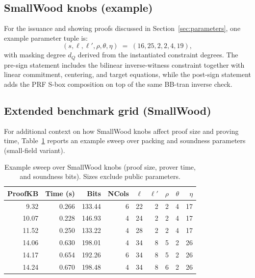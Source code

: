 \subsection{SmallWood knobs (example)}
For the issuance and showing proofs discussed in Section~\ref{sec:parameters}, one example parameter tuple is:
\[
  (s,\ell,\ell',\rho,\theta,\eta)\;=\;(16,25,2,2,4,19),
\]
with masking degree \(d_Q\) derived from the instantiated constraint degrees. The pre-sign statement includes the bilinear inverse-witness constraint together with linear commitment, centering, and target equations, while the post-sign statement adds the PRF S-box composition on top of the same BB-tran inverse check.

\subsection{Extended benchmark grid (SmallWood)}
For additional context on how SmallWood knobs affect proof size and proving time, Table~\ref{tab:results-grid} reports
an example sweep over packing and soundness parameters (small-field variant).

\begin{table}[H]
\centering
\footnotesize
\setlength{\tabcolsep}{4pt}
\begin{tabular}{r r r r r r r r r}
\toprule
\textbf{ProofKB} & \textbf{Time (s)} & \textbf{Bits} & \textbf{NCols} & \(\ell\) & \(\ell'\) & \(\rho\) & \(\theta\) & \(\eta\)\\
\midrule
\ \ 9.32 & 0.266 & 133.44 & 6 & 22 & 2 & 2 & 4 & 17 \\
10.07 & 0.228 & 146.93 & 4 & 24 & 2 & 2 & 4 & 17 \\
11.52 & 0.250 & 133.22 & 4 & 28 & 2 & 2 & 4 & 17 \\
\midrule[1.2pt]
14.06 & 0.630 & 198.01 & 4 & 34 & 8 & 5 & 2 & 26 \\
14.17 & 0.654 & 192.26 & 6 & 34 & 8 & 5 & 2 & 26 \\
14.24 & 0.670 & 198.48 & 4 & 34 & 8 & 6 & 2 & 26 \\
\bottomrule
\end{tabular}
\caption{Example sweep over SmallWood knobs (proof size, prover time, and soundness bits). Sizes exclude public
parameters.}
\label{tab:results-grid}
\end{table}
